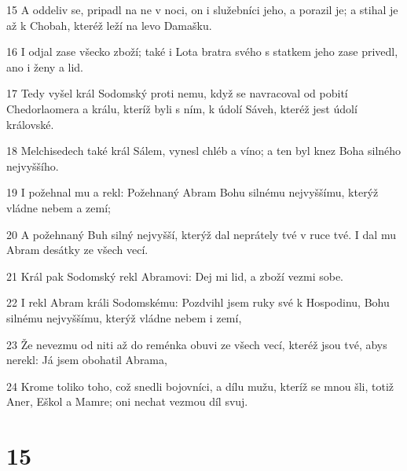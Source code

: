 \par 15 A oddeliv se, pripadl na ne v noci, on i služebníci jeho, a porazil je; a stihal je až k Chobah, kteréž leží na levo Damašku.
\par 16 I odjal zase všecko zboží; také i Lota bratra svého s statkem jeho zase privedl, ano i ženy a lid.
\par 17 Tedy vyšel král Sodomský proti nemu, když se navracoval od pobití Chedorlaomera a králu, kteríž byli s ním, k údolí Sáveh, kteréž jest údolí královské.
\par 18 Melchisedech také král Sálem, vynesl chléb a víno; a ten byl knez Boha silného nejvyššího.
\par 19 I požehnal mu a rekl: Požehnaný Abram Bohu silnému nejvyššímu, kterýž vládne nebem a zemí;
\par 20 A požehnaný Buh silný nejvyšší, kterýž dal neprátely tvé v ruce tvé. I dal mu Abram desátky ze všech vecí.
\par 21 Král pak Sodomský rekl Abramovi: Dej mi lid, a zboží vezmi sobe.
\par 22 I rekl Abram králi Sodomskému: Pozdvihl jsem ruky své k Hospodinu, Bohu silnému nejvyššímu, kterýž vládne nebem i zemí,
\par 23 Že nevezmu od niti až do reménka obuvi ze všech vecí, kteréž jsou tvé, abys nerekl: Já jsem obohatil Abrama,
\par 24 Krome toliko toho, což snedli bojovníci, a dílu mužu, kteríž se mnou šli, totiž Aner, Eškol a Mamre; oni nechat vezmou díl svuj.

\chapter{15}

